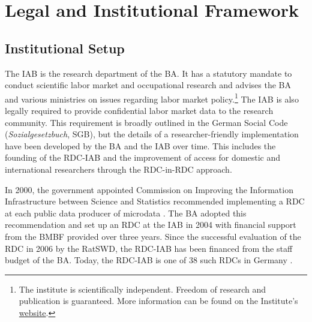 \hypertarget{legal-and-institutional-framework}{%
\section{Legal and Institutional Framework}\label{legal-and-institutional-framework}}

\hypertarget{institutional-setup}{%
\subsection{Institutional Setup}\label{institutional-setup}}

The IAB is the research department of the BA. It has a statutory mandate to conduct scientific labor market and occupational research and advises the BA and various ministries on issues regarding labor market policy.\footnote{The institute is scientifically independent. Freedom of research and publication is guaranteed. More information can be found on the Institute's \href{https://www.iab.de/en/iab-aktuell.aspx}{website}.} The IAB is also legally required to provide confidential labor market data to the research community. This requirement is broadly outlined in the German Social Code (\emph{Sozialgesetzbuch}, SGB), but the details of a researcher-friendly implementation have been developed by the BA and the IAB over time. This includes the founding of the RDC-IAB and the improvement of access for domestic and international researchers through the RDC-in-RDC approach.

In 2000, the government appointed Commission on Improving the Information Infrastructure between Science and Statistics recommended implementing a RDC at each public data producer of microdata \citep{kvikommissionzurverbesserungderinformationelleninfrastrukturzwischenwissenschaftundstatistik2001}. The BA adopted this recommendation and set up an RDC at the IAB in 2004 with financial support from the BMBF provided over three years. Since the successful evaluation of the RDC in 2006 by the RatSWD, the RDC-IAB has been financed from the staff budget of the BA. Today, the RDC-IAB is one of 38 such RDCs in Germany \citep{germandataforum}.

